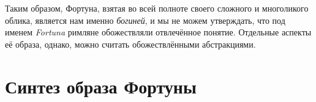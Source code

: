 Таким образом, Фортуна, взятая во всей полноте своего сложного и многоликого облика, является нам именно \textit{богиней}, и мы не можем утверждать, что под именем \textit{Fortuna} римляне обожествляли отвлечённое понятие. Отдельные аспекты её образа, однако, можно считать обожествлёнными абстракциями.





\section{Синтез образа Фортуны}


